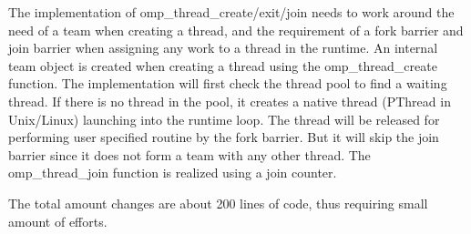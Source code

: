 The implementation of  {\sf omp\_thread\_create/exit/join} needs to work around the need of a team when creating a thread, and the requirement 
of a fork barrier and join barrier when assigning any work to a thread in the runtime. An internal team object is created when creating a thread 
using the {\sf omp\_thread\_create} function. The implementation will first check the thread pool to find a waiting thread. If there is no thread
in the pool, it creates a native thread (PThread in Unix/Linux) launching into the runtime loop. The thread will be released for performing
user specified routine by the fork barrier. But it will skip the join barrier since it does not form a team with any other thread. 
The {\sf omp\_thread\_join} function is realized using a join counter. 

The total amount changes are about 200 lines of code, thus requiring small amount of efforts.  

